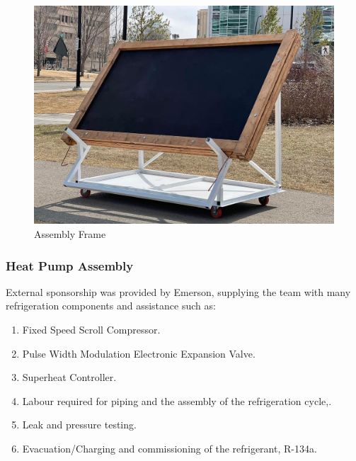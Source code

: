 \begin{figure}[H]
    \centering
    \includegraphics[width=12.5cm]{images/frame_assembly.jpg}
    \caption{Assembly Frame}
\end{figure}


\subsubsection{Heat Pump Assembly}

External sponsorship was provided by Emerson, supplying the team with many refrigeration components and assistance such as:

\medskip
\begin{enumerate}[itemsep=3mm, parsep=-1mm, label=\roman*.]
    \item Fixed Speed Scroll Compressor.
    \item Pulse Width Modulation Electronic Expansion Valve.
    \item Superheat Controller.
    \item Labour required for piping and the assembly of the refrigeration cycle,.
    \item Leak and pressure testing.
    \item Evacuation/Charging and commissioning of the refrigerant, R-134a.
\end{enumerate}


